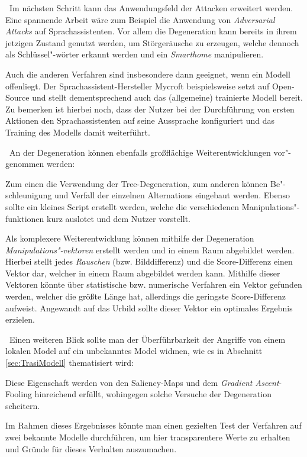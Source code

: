 ~\newline Im nächsten Schritt kann das Anwendungsfeld der Attacken erweitert werden. 
Eine spannende Arbeit wäre zum Beispiel die Anwendung von \textit{Adversarial Attacks} auf Sprachassistenten. 
Vor allem die Degeneration kann bereits in ihrem jetzigen Zustand genutzt werden, um Störgeräusche zu erzeugen, welche dennoch als Schlüssel"-wörter erkannt werden und ein \textit{Smarthome} manipulieren. 

Auch die anderen Verfahren sind insbesondere dann geeignet, wenn ein Modell offenliegt. 
Der Sprachassistent-Hersteller Mycroft beispielsweise setzt auf Open-Source und stellt dementsprechend auch das (allgemeine) trainierte Modell bereit. 
Zu bemerken ist hierbei noch, dass der Nutzer bei der Durchführung von ersten Aktionen den Sprachassistenten auf seine Aussprache konfiguriert und das Training des Modells damit weiterführt.  

~\newline An der Degeneration können ebenfalls großflächige Weiterentwicklungen vor"-genommen werden: 

Zum einen die Verwendung der Tree-Degeneration, zum anderen können Be"-schleunigung und Verfall der einzelnen Alternations eingebaut werden. 
Ebenso sollte ein kleines Script erstellt werden, welche die verschiedenen Manipulations"-funktionen kurz auslotet und dem Nutzer vorstellt. 

Als komplexere Weiterentwicklung können mithilfe der Degeneration \textit{Manipulations"-vektoren} erstellt werden und in einem Raum abgebildet werden. 
Hierbei stellt jedes \textit{Rauschen} (bzw. Bilddifferenz) und die Score-Differenz einen Vektor dar, welcher in einem Raum abgebildet werden kann. 
Mithilfe dieser Vektoren könnte über statistische bzw. numerische Verfahren ein Vektor gefunden werden, welcher die größte Länge hat, allerdings die geringste Score-Differenz aufweist. 
Angewandt auf das Urbild sollte dieser Vektor ein optimales Ergebnis erzielen.  

~\newline Einen weiteren Blick sollte man der Überführbarkeit der Angriffe von einem lokalen Model auf ein unbekanntes Model widmen, wie es in Abschnitt \ref{sec:TrasiModell} thematisiert wird: 

Diese Eigenschaft werden von den Saliency-Maps und dem \textit{Gradient Ascent}-Fooling hinreichend erfüllt, wohingegen solche Versuche der Degeneration scheitern. 

Im Rahmen dieses Ergebnisses könnte man einen gezielten Test der Verfahren auf zwei bekannte Modelle durchführen, um hier transparentere Werte zu erhalten und Gründe für dieses Verhalten auszumachen. 